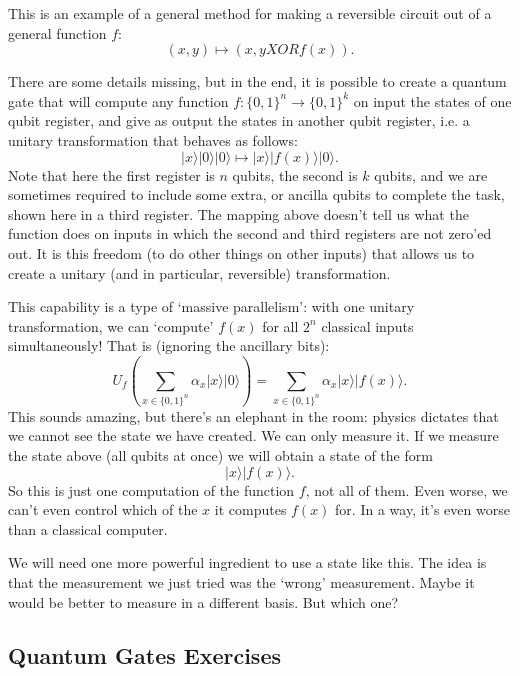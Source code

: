 \documentclass{article}
\theoremstyle{plain}
\theoremstyle{definition}
\theoremstyle{remark}
\numberwithin{theorem}{section}
\begin{document}
This is an example of a general method for making a reversible circuit out of a general function $f$:
\[
(x,y) \mapsto (x, y XOR f(x) ).
\]

There are some details missing, but in the end, it is possible to create a quantum gate that will compute any function $f: \{ 0,1 \}^n \rightarrow \{0, 1 \}^k$ on input the states of one qubit register, and give as output the states in another qubit register, i.e. a unitary transformation that behaves as follows:
\[
| x \rangle | 0 \rangle | 0 \rangle \mapsto | x \rangle | f(x) \rangle | 0 \rangle.
\]
Note that here the first register is $n$ qubits, the second is $k$ qubits, and we are sometimes required to include some extra, or ancilla qubits to complete the task, shown here in a third register.  The mapping above doesn't tell us what the function does on inputs in which the second and third registers are not zero'ed out.  It is this freedom (to do other things on other inputs) that allows us to create a unitary (and in particular, reversible) transformation.

This capability is a type of `massive parallelism': with one unitary transformation, we can `compute' $f(x)$ for all $2^n$ classical inputs simultaneously!  That is (ignoring the ancillary bits):
\[
 U_f \left(
 \sum_{x \in \{0,1\}^n }
 \alpha_x | x \rangle | 0 \rangle
 \right) 
 =
 \sum_{x \in \{0,1\}^n }
 \alpha_x | x \rangle | f(x) \rangle.
\]
This sounds amazing, but there's an elephant in the room:  physics dictates that we cannot see the state we have created.  We can only measure it.  If we measure the state above (all qubits at once) we will obtain a state of the form
\[
| x \rangle | f(x) \rangle.
\]
So this is just one computation of the function $f$, not all of them.  Even worse, we can't even control which of the $x$ it computes $f(x)$ for.  In a way, it's even worse than a classical computer.

We will need one more powerful ingredient to use a state like this.  The idea is that the measurement we just tried was the `wrong' measurement.  Maybe it would be better to measure in a different basis.  But which one?

\subsection{Quantum Gates Exercises}
\end{document}
